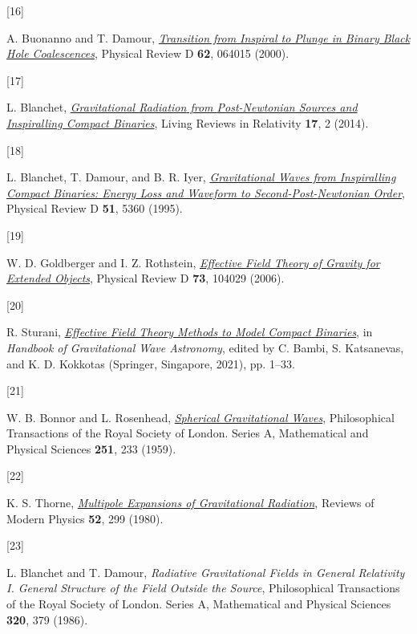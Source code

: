 \documentclass[
  10pt,
  a4paper,
  DIV=11,
  numbers=noendperiod,
  twoside]{scrreprt}
\newlength{\cslhangindent}
\newlength{\csllabelwidth}
\newlength{\cslentryspacingunit} %
\newenvironment{CSLReferences}[2] %
 {%
  \setlength{\parindent}{0pt}
  \ifodd #1
  \let\oldpar\par
  \def\par{\hangindent=\cslhangindent\oldpar}
  \fi
  \setlength{\parskip}{#2\cslentryspacingunit}
 }%
 {}
\newcommand{\CSLLeftMargin}[1]{\parbox[t]{\csllabelwidth}{#1}}
\newcommand{\CSLRightInline}[1]{\parbox[t]{\linewidth - \csllabelwidth}{#1}\break}
\DeclareRobustCommand{\[}{\begin{equation}}
\DeclareRobustCommand{\]}{\end{equation}}
\begin{document}
\begin{CSLReferences}{0}{0}
\leavevmode{}%
\CSLLeftMargin{{[}16{]} }%
\CSLRightInline{A. Buonanno and T. Damour,
\emph{\href{https://doi.org/10.1103/PhysRevD.62.064015}{Transition from
Inspiral to Plunge in Binary Black Hole Coalescences}}, Physical Review
D \textbf{62}, 064015 (2000).}

\leavevmode{}%
\CSLLeftMargin{{[}17{]} }%
\CSLRightInline{L. Blanchet,
\emph{\href{https://doi.org/10.12942/lrr-2014-2}{Gravitational
{Radiation} from {Post-Newtonian Sources} and {Inspiralling Compact
Binaries}}}, Living Reviews in Relativity \textbf{17}, 2 (2014).}

\leavevmode{}%
\CSLLeftMargin{{[}18{]} }%
\CSLRightInline{L. Blanchet, T. Damour, and B. R. Iyer,
\emph{\href{https://doi.org/10.1103/PhysRevD.51.5360}{Gravitational
Waves from Inspiralling Compact Binaries: {Energy} Loss and Waveform to
Second-Post-{Newtonian} Order}}, Physical Review D \textbf{51}, 5360
(1995).}

\leavevmode{}%
\CSLLeftMargin{{[}19{]} }%
\CSLRightInline{W. D. Goldberger and I. Z. Rothstein,
\emph{\href{https://doi.org/10.1103/PhysRevD.73.104029}{Effective Field
Theory of Gravity for Extended Objects}}, Physical Review D \textbf{73},
104029 (2006).}

\leavevmode{}%
\CSLLeftMargin{{[}20{]} }%
\CSLRightInline{R. Sturani,
\emph{\href{https://doi.org/10.1007/978-981-15-4702-7_32-1}{Effective
{Field Theory Methods} to {Model Compact Binaries}}}, in \emph{Handbook
of {Gravitational Wave Astronomy}}, edited by C. Bambi, S. Katsanevas,
and K. D. Kokkotas ({Springer}, {Singapore}, 2021), pp. 1--33.}

\leavevmode{}%
\CSLLeftMargin{{[}21{]} }%
\CSLRightInline{W. B. Bonnor and L. Rosenhead,
\emph{\href{https://doi.org/10.1098/rsta.1959.0003}{Spherical
Gravitational Waves}}, Philosophical Transactions of the Royal Society
of London. Series A, Mathematical and Physical Sciences \textbf{251},
233 (1959).}

\leavevmode{}%
\CSLLeftMargin{{[}22{]} }%
\CSLRightInline{K. S. Thorne,
\emph{\href{https://doi.org/10.1103/RevModPhys.52.299}{Multipole
Expansions of Gravitational Radiation}}, Reviews of Modern Physics
\textbf{52}, 299 (1980).}

\leavevmode{}%
\CSLLeftMargin{{[}23{]} }%
\CSLRightInline{L. Blanchet and T. Damour, \emph{Radiative
{Gravitational Fields} in {General Relativity I}. {General Structure} of
the {Field} Outside the {Source}}, Philosophical Transactions of the
Royal Society of London. Series A, Mathematical and Physical Sciences
\textbf{320}, 379 (1986).}


\end{CSLReferences}
\end{document}
